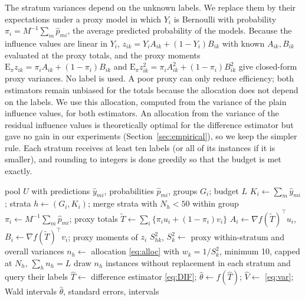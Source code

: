 The stratum variances depend on the unknown labels. We replace them by their expectations under a proxy model in which $Y_i$ is Bernoulli with probability $\pi_i=M^{-1}\sum_m\hat p_{mi}$, the average predicted probability of the models. Because the influence values are linear in $Y_i$, $z_{ik}=Y_iA_{ik}+(1-Y_i)B_{ik}$ with known $A_{ik},B_{ik}$ evaluated at the proxy totals, and the proxy moments $\mathrm E_\pi z_{ik}=\pi_iA_{ik}+(1-\pi_i)B_{ik}$ and $\mathrm E_\pi z^2_{ik}=\pi_iA^2_{ik}+(1-\pi_i)B^2_{ik}$ give closed-form proxy variances. No label is used. A poor proxy can only reduce efficiency; both estimators remain unbiased for the totals because the allocation does not depend on the labels. We use this allocation, computed from the variance of the plain influence values, for both estimators. An allocation from the variance of the residual influence values is theoretically optimal for the difference estimator but gave no gain in our experiments (Section~\ref{sec:empirical}), so we keep the simpler rule. Each stratum receives at least ten labels (or all of its instances if it is smaller), and rounding to integers is done greedily so that the budget is met exactly.

\begin{algorithm}[t]
\caption{PATTERN-DIF for comparing $M$ classifiers on group-fairness contrasts}\label{alg:pattern}
\begin{algorithmic}[1]
\Require pool $U$ with predictions $\hat y_{mi}$, probabilities $\hat p_{mi}$, groups $G_i$; budget $L$
\State $K_i\gets\sum_m\hat y_{mi}$; strata $h\gets(G_i,K_i)$; merge strata with $N_h<50$ within group
\State $\pi_i\gets M^{-1}\sum_m\hat p_{mi}$; proxy totals $\tilde T\gets\sum_i\{\pi_iu_i+(1-\pi_i)v_i\}$
\State $A_i\gets\nabla f(\tilde T)^\top u_i$, $B_i\gets\nabla f(\tilde T)^\top v_i$; proxy moments of $z_i$
\State $S^2_{hk}$, $S^2_k\gets$ proxy within-stratum and overall variances
\State $n_h\gets$ allocation \eqref{eq:alloc} with $w_k=1/S^2_k$, minimum 10, capped at $N_h$, $\sum_h n_h=L$
\State draw $n_h$ instances without replacement in each stratum and query their labels
\State $\hat T\gets$ difference estimator \eqref{eq:DIF}; $\hat\theta\gets f(\hat T)$; $\hat V\gets$ \eqref{eq:var}; Wald intervals
\State \Return $\hat\theta$, standard errors, intervals
\end{algorithmic}
\end{algorithm}

